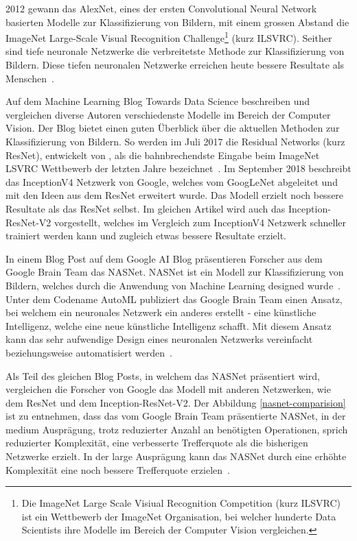 2012 gewann das AlexNet, eines der ersten Convolutional Neural Network basierten Modelle zur Klassifizierung von Bildern, mit einem grossen Abstand die ImageNet Large-Scale Visual Recognition Challenge\footnote{Die ImageNet Large Scale Visiual Recognition Competition (kurz ILSVRC) ist ein Wettbewerb der ImageNet Organisation, bei welcher hunderte Data Scientists ihre Modelle im Bereich der Computer Vision vergleichen.} (kurz ILSVRC). Seither sind tiefe neuronale Netzwerke die verbreitetste Methode zur Klassifizierung von Bildern. Diese tiefen neuronalen Netzwerke erreichen heute bessere Resultate als Menschen~\autocite{SSD}.

Auf dem Machine Learning Blog Towards Data Science beschreiben und vergleichen diverse Autoren verschiedenste Modelle im Bereich der Computer Vision. Der Blog bietet einen guten Überblick über die aktuellen Methoden zur Klassifizierung von Bildern. So werden im Juli 2017 die Residual Networks (kurz ResNet), entwickelt von \textcite{He2015}, als die bahnbrechendste Eingabe beim ImageNet LSVRC Wettbewerb der letzten Jahre bezeichnet~\autocite{Fungg2017ResNet}. Im September 2018 beschreibt \textcite{SHTsuang2018Inception} das InceptionV4 Netzwerk von Google, welches vom GoogLeNet abgeleitet und mit den Ideen aus dem ResNet erweitert wurde. Das Modell erzielt noch bessere Resultate als das ResNet selbst. Im gleichen Artikel wird auch das Inception-ResNet-V2 vorgestellt, welches im Vergleich zum InceptionV4 Netzwerk schneller trainiert werden kann und zugleich etwas bessere Resultate erzielt. 

In einem Blog Post auf dem Google AI Blog präsentieren Forscher aus dem Google Brain Team das NASNet. NASNet ist ein Modell zur Klassifizierung von Bildern, welches durch die Anwendung von Machine Learning designed wurde~\autocite{GoogleNasNet}. Unter dem Codename AutoML publiziert das Google Brain Team einen Ansatz, bei welchem ein neuronales Netzwerk ein anderes erstellt - eine künstliche Intelligenz, welche eine neue künstliche Intelligenz schafft. Mit diesem Ansatz kann das sehr aufwendige Design eines neuronalen Netzwerks vereinfacht beziehungsweise automatisiert werden~\autocite{GoogleAutoML}.

Als Teil des gleichen Blog Posts, in welchem das NASNet präsentiert wird, vergleichen die Forscher von Google das Modell mit anderen Netzwerken, wie dem ResNet und dem Inception-ResNet-V2. Der Abbildung \ref{nasnet-comparision} ist zu entnehmen, dass das vom Google Brain Team präsentierte NASNet, in der medium Ausprägung, trotz reduzierter Anzahl an benötigten Operationen, sprich reduzierter Komplexität, eine verbesserte Trefferquote als die bisherigen Netzwerke erzielt. In der large Ausprägung kann das NASNet durch eine erhöhte Komplexität eine noch bessere Trefferquote erzielen~\autocite{GoogleNasNet}.

